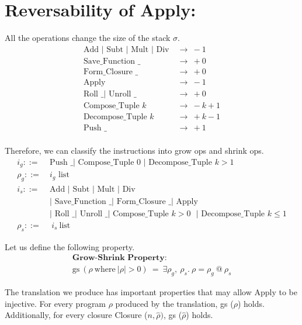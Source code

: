 \documentclass[11pt]{article}
\begin{document}
\section*{Reversability of Apply:}

All the operations change the size of the stack $\sigma$.
\begin{align*}
        \text{Add $|$ Subt $|$ Mult $|$ Div}\ &\rightarrow\ -1\\
        \text {Save\_Function \_}\ &\rightarrow\ +0\\
        \text {Form\_Closure \_}\ &\rightarrow\ +0\\
        \text {Apply}\ &\rightarrow\ -1\\
        \text{Roll \_ $|$ Unroll \_}\ &\rightarrow\ +0\\
        \text {Compose\_Tuple $k$}\ &\rightarrow\ -k + 1\\
        \text {Decompose\_Tuple $k$}\ &\rightarrow\ +k - 1\\
        \text {Push \_}\ &\rightarrow\ +1\\
\end{align*}

Therefore, we can classify the instructions into grow ops and shrink ops.
\begin{align*}
    i_g ::=\ & \text{Push \_ $|$ Compose\_Tuple 0 $|$ Decompose\_Tuple $k > 1$}\\
    \rho_g ::=\ &\text{$i_g$ list}\\
    i_s ::=\ &\text{Add $|$ Subt $|$ Mult $|$ Div}\\
    &\text{$|$ Save\_Function \_ $|$ Form\_Closure \_ $|$ Apply}\\
    &\text{$|$ Roll \_ $|$ Unroll \_ $|$ Compose\_Tuple $k>0$ $|$ Decompose\_Tuple $k \le 1$}\\
    \rho_s ::=&\ i_s\ \text{list}
\end{align*}

Let us define the following property.
\begin{align*}
        \textbf{Grow-Shrink Property}:\\
            \text{gs}\ (\rho\ \text{where}\ |\rho| > 0)\ = \ \exists \rho_g,\ \rho_s.\ \rho = \rho_g\ @\ \rho_s
\end{align*}
    
        The translation we produce has important properties that may allow Apply to be injective. For every program $\rho$ produced by the translation, gs ($\rho$) holds. Additionally, for every closure Closure ($n, \hat{\rho})$, gs ($\hat{\rho}$) holds. 
\end{document}
